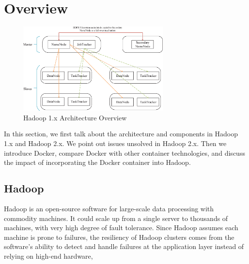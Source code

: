\section{Overview}
\label{sec:overview}

\begin{figure}[t]
  \centering
  \includegraphics[width=3in]{figs/HadoopOverview.eps}
  \caption{Hadoop 1.x Architecture Overview}
  \label{fig:hadoop1.xoverview}
\end{figure}
In this section, we first talk about the architecture and components in Hadoop 1.x and Hadoop 2.x. We point out issues unsolved in Hadoop 2.x. Then we introduce Docker, compare Docker with other container technologies, and discuss the impact of incorporating the Docker container into Hadoop.
\subsection{Hadoop}

Hadoop is an open-source software for large-scale data processing with commodity machines. It could scale up from a single server to thousands of machines, with very high degree of fault tolerance. Since Hadoop assumes each machine is prone to failures, the resiliency of Hadoop clusters comes from the software's ability to detect and handle failures at the application layer instead of relying on high-end hardware, 

